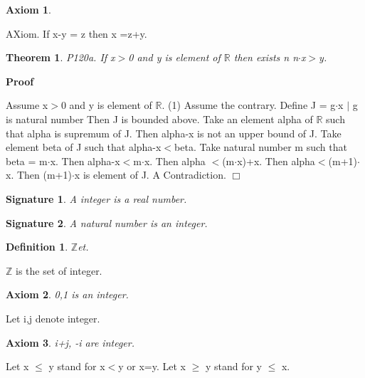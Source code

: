 \documentclass{article}
\newenvironment{forthel}{\begin{leftbar}}{\end{leftbar}}
\newenvironment{proof}{\noindent\textbf{Proof\ }}{\hspace*{\fill}$\Box$\medskip}
\newtheorem{axiom}{Axiom}
\newtheorem{theorem}{Theorem}
\newtheorem{definition}{Definition}
\newtheorem{signature}{Signature}
\begin{document}
\begin{forthel}
\begin{axiom}
\end{axiom}

AXiom. If x-y = z then x =z+y. 


\begin{theorem}
 P120a. If x$>$0 and y is element of $\mathbb{R}$ then exists n  n$\cdot$x$>$y.
\end{theorem}\begin{proof}

Assume x$>$0 and y is element of $\mathbb{R}$.
(1)	Assume the contrary.	
Define J = {g$\cdot$x $|$ g is natural number}
Then J is bounded above.
Take an element alpha of $\mathbb{R}$ such that alpha is supremum of J.
Then alpha-x is not an upper bound of J.
Take element beta of J such that alpha-x$<$beta.
Take natural number m such that beta = m$\cdot$x.
Then alpha-x$<$m$\cdot$x. Then alpha $<$(m$\cdot$x)+x.	
Then alpha$<$(m+1)$\cdot$x.
Then (m+1)$\cdot$x is element of J.
A Contradiction.
\end{proof}




\begin{signature} A integer is a real number.

\end{signature}
\begin{signature} A natural number is an integer.

\end{signature}

\begin{definition} $\mathbb{Z}$et.

\end{definition}
$\mathbb{Z}$ is the set of integer.
\begin{axiom} 0,1 is an integer.

\end{axiom}

Let i,j denote integer.
\begin{axiom} i+j, -i are integer.

\end{axiom}

Let x $\leq$ y stand for x$<$y or x=y.
Let x $\geq$ y stand for y $\leq$ x.


\end{forthel}
\end{document}
